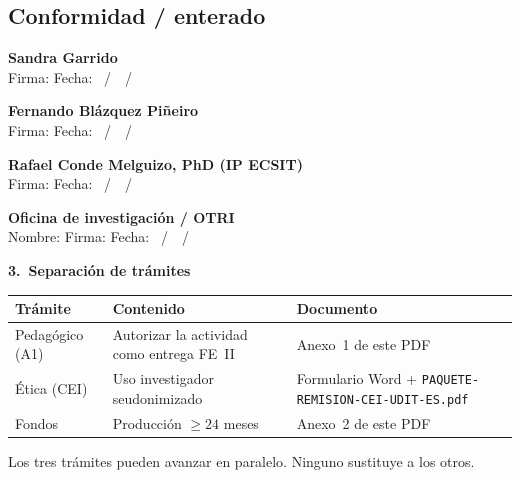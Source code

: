 \documentclass[11pt,a4paper]{scrartcl}
\newcommand{\AnnexTitle}[1]{%
  \clearpage
  \LogoRow
  \begin{center}{\Large\sffamily\bfseries #1}\end{center}
  \vspace{0.4em}
  \noindent{\color{rulegray}\hrule height 0.4pt}
  \vspace{0.5em}
}
\begin{document}
\subsection*{Conformidad / enterado}
\vspace{0.55em}
\noindent\textbf{Sandra Garrido}\\
Firma: \hrulefill\quad Fecha: \underline{\hspace{1.1cm}}~/~\underline{\hspace{1.1cm}}~/~\underline{\hspace{2cm}}

\vspace{0.7em}
\noindent\textbf{Fernando Blázquez Piñeiro}\\
Firma: \hrulefill\quad Fecha: \underline{\hspace{1.1cm}}~/~\underline{\hspace{1.1cm}}~/~\underline{\hspace{2cm}}

\vspace{0.7em}
\noindent\textbf{Rafael Conde Melguizo, PhD (IP ECSIT)}\\
Firma: \hrulefill\quad Fecha: \underline{\hspace{1.1cm}}~/~\underline{\hspace{1.1cm}}~/~\underline{\hspace{2cm}}

\vspace{0.7em}
\noindent\textbf{Oficina de investigación / OTRI}\\
Nombre: \underline{\hspace{4.5cm}}\quad
Firma: \hrulefill\quad Fecha: \underline{\hspace{1.1cm}}~/~\underline{\hspace{1.1cm}}~/~\underline{\hspace{2cm}}

\AnnexTitle{3.\ Separación de trámites}

\renewcommand{\arraystretch}{1.25}
\begin{tabularx}{\textwidth}{@{}>{\raggedright\arraybackslash}p{3.2cm}X>{\raggedright\arraybackslash}p{3.8cm}@{}}
  \toprule
  \textbf{Trámite} & \textbf{Contenido} & \textbf{Documento} \\
  \midrule
  Pedagógico (A1) & Autorizar la actividad como entrega FE~II & Anexo~1 de este PDF \\
  Ética (CEI) & Uso investigador seudonimizado & Formulario Word + \texttt{PAQUETE-REMISION-CEI-UDIT-ES.pdf} \\
  Fondos & Producción $\geq 24$ meses & Anexo~2 de este PDF \\
  \bottomrule
\end{tabularx}

\vspace{0.6em}
\noindent Los tres trámites pueden avanzar en paralelo. Ninguno sustituye a los otros.

\vspace{1em}
\AuthoritiesBlock
\end{document}
